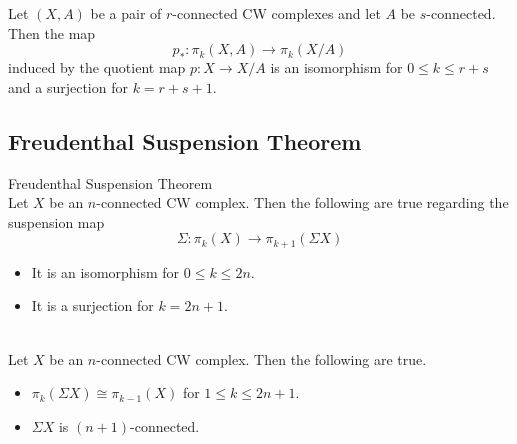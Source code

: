 \documentclass[a4paper]{article}
\begin{document}
\begin{prp}{}{} Let $(X,A)$ be a pair of $r$-connected CW complexes and let $A$ be $s$-connected. Then the map $$p_\ast:\pi_k(X,A)\to\pi_k(X/A)$$ induced by the quotient map $p:X\to X/A$ is an isomorphism for $0\leq k\leq r+s$ and a surjection for $k=r+s+1$. 
\end{prp}

\subsection{Freudenthal Suspension Theorem}
\begin{thm}{Freudenthal Suspension Theorem}{}\\
Let $X$ be an $n$-connected CW complex. Then the following are true regarding the suspension map $$\Sigma:\pi_k(X)\to\pi_{k+1}(\Sigma X)$$
\begin{itemize}
\item It is an isomorphism for $0\leq k\leq 2n$. 
\item It is a surjection for $k=2n+1$. 
\end{itemize}
\end{thm}

\begin{crl}{}{}\\
Let $X$ be an $n$-connected CW complex. Then the following are true. 
\begin{itemize}
\item $\pi_k(\Sigma X)\cong\pi_{k-1}(X)$ for $1\leq k\leq 2n+1$. 
\item $\Sigma X$ is $(n+1)$-connected. 
\end{itemize}
\end{crl}
\end{document}
